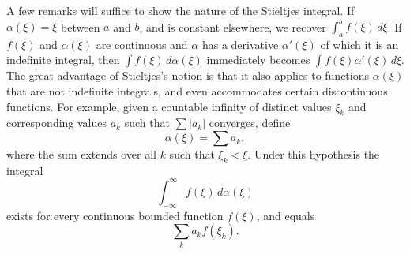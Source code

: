\documentclass[
  paper=b5,
  fontsize=13pt,
  twoside=true,
  open=any,
  bookmarkpackage=false,
  chapterprefix=true,
  headings=normal
]{scrbook}
\theoremstyle{definition}
\begin{document}
A few remarks will suffice to show the nature of the Stieltjes integral.  If
\(\alpha(\xi)=\xi\) between \(a\) and \(b\), and is constant elsewhere, we
recover \(\int_a^b f(\xi)\,d\xi\).  If \(f(\xi)\) and \(\alpha(\xi)\) are
continuous and \(\alpha\) has a derivative \(\alpha'(\xi)\) of which it is an
indefinite integral, then \(\int f(\xi)\,d\alpha(\xi)\) immediately becomes
\(\int f(\xi)\alpha'(\xi)\,d\xi\).  The great advantage of Stieltjes's notion is
that it also applies to functions \(\alpha(\xi)\) that are not indefinite
integrals, and even accommodates certain discontinuous functions.  For example,
given a countable infinity of distinct values \(\xi_k\) and corresponding
values \(a_k\) such that \(\sum\lvert a_k\rvert\) converges, define
\[
  \alpha(\xi)=\sum a_k,
\]
where the sum extends over all \(k\) such that \(\xi_k<\xi\).  Under this
hypothesis the integral
\[
  \int_{-\infty}^{\infty}f(\xi)\,d\alpha(\xi)
\]
exists for every continuous bounded function \(f(\xi)\), and equals
\[
  \sum_k a_kf(\xi_k).
\]
\end{document}

